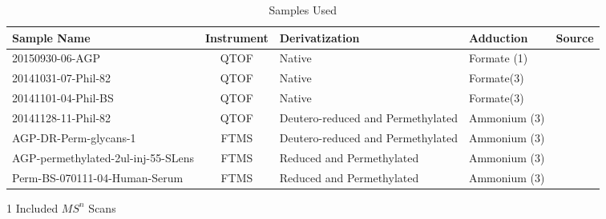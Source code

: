    \begin{table}
        \caption{Samples Used}\label{tab:sample_overview}
        \small
        \centering
        \begin{threeparttable}
        \begin{tabular}{p{4.1cm} | c | p{3cm} | p{3cm} | c}
            Sample Name & Instrument & Derivatization & Adduction & Source\\
            \hline
            20150930-06-AGP & QTOF & Native & Formate (1) & \cite{Khatri2016a}\\
            20141031-07-Phil-82 & QTOF & Native & Formate(3) & \cite{Khatri2016a}\\
            20141101-04-Phil-BS & QTOF & Native & Formate(3) & \cite{Khatri2016a}\\
            20141128-11-Phil-82\tnote{1} & QTOF &
                Deutero-reduced and Permethylated & Ammonium (3) & \cite{Khatri2016a}\\
            AGP-DR-Perm-glycans-1\tnote{1} & FTMS &
                Deutero-reduced and Permethylated & Ammonium (3) & \cite{Khatri2016a}\\
            AGP-permethylated-2ul-inj-55-SLens\tnote{1} & FTMS &
                Reduced and Permethylated & Ammonium (3) & \cite{Khatri2016a}\\
            Perm-BS-070111-04-Human-Serum\tnote{1} & FTMS &
                Reduced and Permethylated & Ammonium (3) & \cite{Yu2013}\\
        \end{tabular}
        \begin{tablenotes}
            \item[1] Included $MS^n$ Scans
        \end{tablenotes}
        \end{threeparttable}
    \end{table}
